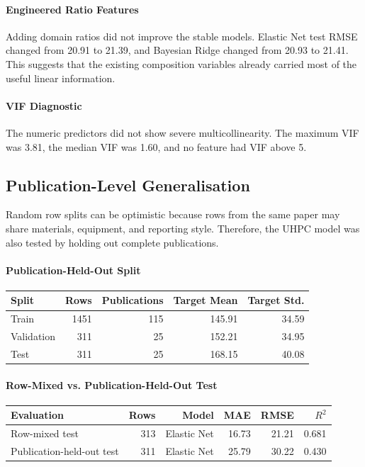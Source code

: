 \documentclass{article}
\begin{document}
\paragraph{Engineered Ratio Features}
Adding domain ratios did not improve the stable models. Elastic Net test RMSE changed from 20.91 to 21.39, and Bayesian Ridge changed from 20.93 to 21.41. This suggests that the existing composition variables already carried most of the useful linear information.

\paragraph{VIF Diagnostic}
The numeric predictors did not show severe multicollinearity. The maximum VIF was 3.81, the median VIF was 1.60, and no feature had VIF above 5.

\subsection{Publication-Level Generalisation}
Random row splits can be optimistic because rows from the same paper may share materials, equipment, and reporting style. Therefore, the UHPC model was also tested by holding out complete publications.

\paragraph{Publication-Held-Out Split}
\begin{center}
\begin{tabular}{@{}lrrrr@{}}
\toprule
\textbf{Split} & \textbf{Rows} & \textbf{Publications} & \textbf{Target Mean} & \textbf{Target Std.} \\
\midrule
Train      & 1451 & 115 & 145.91 & 34.59 \\
Validation & 311  & 25  & 152.21 & 34.95 \\
Test       & 311  & 25  & 168.15 & 40.08 \\
\bottomrule
\end{tabular}
\end{center}

\paragraph{Row-Mixed vs. Publication-Held-Out Test}
\begin{center}
\begin{tabular}{@{}lrrrrr@{}}
\toprule
\textbf{Evaluation} & \textbf{Rows} & \textbf{Model} & \textbf{MAE} & \textbf{RMSE} & \textbf{$R^2$} \\
\midrule
Row-mixed test              & 313 & Elastic Net & 16.73 & 21.21 & 0.681 \\
Publication-held-out test   & 311 & Elastic Net & 25.79 & 30.22 & 0.430 \\
\bottomrule
\end{tabular}
\end{center}
\end{document}
